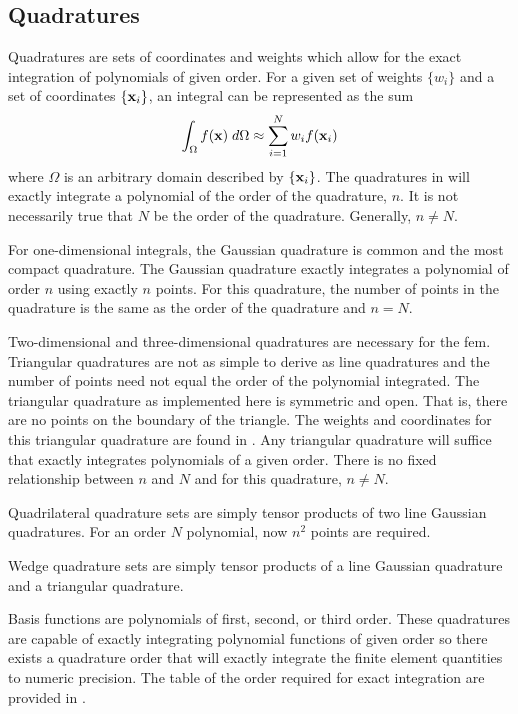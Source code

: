   \subsection{Quadratures}
    \label{sec:quadratures}
    Quadratures are sets of coordinates and weights which allow for the exact 
    integration of polynomials of given order. For a given set of weights 
    $\{w_i\}$ and a set of coordinates $\{\mathbf{x}_i\}$, an integral can be 
    represented as the sum
    \begin{equation}
      \label{eq:quadrature}
      \int_{\Omega} f(\mathbf{x}) \;d\Omega \approx \sum_{i=1}^{N} w_i f(\mathbf{x}_i)
    \end{equation}
    where $\Omega$ is an arbitrary domain described by $\{\mathbf{x}_i\}$. The 
    quadratures in  will exactly integrate a polynomial of
    the order of the quadrature, $n$. It is not necessarily true that $N$ be the 
    order of the quadrature. Generally, $n \ne N$.
    
    For one-dimensional integrals, the Gaussian quadrature is common and the 
    most compact quadrature. The Gaussian quadrature exactly integrates a 
    polynomial of order $n$ using exactly $n$ points. For this quadrature, the
    number of points in the quadrature is the same as the order of the
    quadrature and $n=N$.
    
    Two-dimensional and three-dimensional quadratures are necessary for the 
    \gls{fem}. Triangular quadratures are not as simple to derive
    as line quadratures and the number of points need not equal the order of the
    polynomial integrated. The triangular quadrature as implemented here is 
    symmetric and open. That is, there are no points on the boundary of the 
    triangle. The weights and coordinates for this triangular quadrature are 
    found in \cite{triangleQuadrature}. Any triangular quadrature will suffice
    that exactly integrates polynomials of a given order. There is no fixed
    relationship between $n$ and $N$ and for this quadrature, $n \ne N$.
    
    Quadrilateral quadrature sets are simply tensor products of two line 
    Gaussian quadratures. For an order $N$ polynomial, now $n^2$ points are 
    required. 
    
    Wedge quadrature sets are simply tensor products of a line Gaussian 
    quadrature and a triangular quadrature. 
    
    Basis functions are polynomials of first, second, or third order. These 
    quadratures are capable of exactly integrating polynomial functions of given
    order so there exists a quadrature order that will exactly integrate the 
    finite element quantities to numeric precision. The table of the order
    required for exact integration are provided in .

